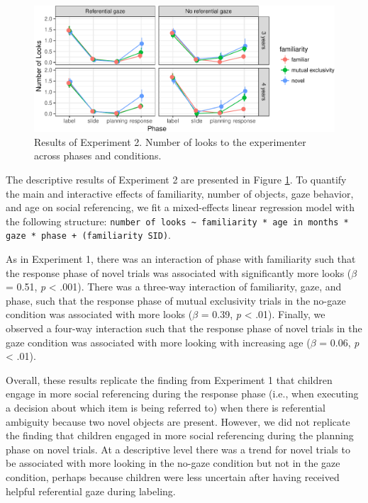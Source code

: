 \documentclass[10pt, letterpaper]{article}
\newenvironment{CodeChunk}{}{}
\begin{document}
\begin{CodeChunk}
\begin{figure}[h]

{\centering \includegraphics{figs/results_e2-1} 

}

\caption[Results of Experiment 2]{Results of Experiment 2. Number of looks to the experimenter across phases and conditions.}\label{fig:results_e2}
\end{figure}
\end{CodeChunk}

The descriptive results of Experiment 2 are presented in Figure
\ref{fig:results_e2}. To quantify the main and interactive effects of
familiarity, number of objects, gaze behavior, and age on social
referencing, we fit a mixed-effects linear regression model with the
following structure:
\texttt{number of looks \textasciitilde{} familiarity * age in months * gaze * phase + (familiarity \textbar{} SID)}.

As in Experiment 1, there was an interaction of phase with familiarity
such that the response phase of novel trials was associated with
significantly more looks (\(\beta\) = 0.51, \emph{p} \textless{} .001).
There was a three-way interaction of familiarity, gaze, and phase, such
that the response phase of mutual exclusivity trials in the no-gaze
condition was associated with more looks (\(\beta\) = 0.39, \emph{p}
\textless{} .01). Finally, we observed a four-way interaction such that
the response phase of novel trials in the gaze condition was associated
with more looking with increasing age (\(\beta\) = 0.06, \emph{p}
\textless{} .01).

Overall, these results replicate the finding from Experiment 1 that
children engage in more social referencing during the response phase
(i.e., when executing a decision about which item is being referred to)
when there is referential ambiguity because two novel objects are
present. However, we did not replicate the finding that children engaged
in more social referencing during the planning phase on novel trials. At
a descriptive level there was a trend for novel trials to be associated
with more looking in the no-gaze condition but not in the gaze
condition, perhaps because children were less uncertain after having
received helpful referential gaze during labeling.
\end{document}
